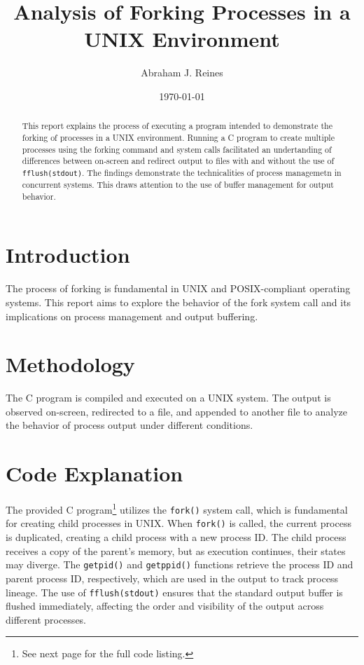 \documentclass[12pt]{article}
\begin{document}
\title{Analysis of Forking Processes in a UNIX Environment}
\author{Abraham J. Reines}
\date{\today}

\maketitle

\begin{abstract}
This report explains the process of executing a program intended to demonstrate the forking of processes in a UNIX environment. Running a C program to create multiple processes using the forking command and system calls facilitated an undertanding of differences between on-screen and redirect output to files with and without the use of \texttt{fflush(stdout)}. The findings demonstrate the technicalities of process managemetn in concurrent systems. This draws attention to the use of buffer management for output behavior. 
\end{abstract}

\section{Introduction}
The process of forking is fundamental in UNIX and POSIX-compliant operating systems. This report aims to explore the behavior of the fork system call and its implications on process management and output buffering.

\section{Methodology}
The C program is compiled and executed on a UNIX system. The output is observed on-screen, redirected to a file, and appended to another file to analyze the behavior of process output under different conditions.

\section{Code Explanation}
The provided C program\footnote{See next page for the full code listing.} utilizes the \texttt{fork()} system call, which is fundamental for creating child processes in UNIX. When \texttt{fork()} is called, the current process is duplicated, creating a child process with a new process ID. The child process receives a copy of the parent's memory, but as execution continues, their states may diverge. The \texttt{getpid()} and \texttt{getppid()} functions retrieve the process ID and parent process ID, respectively, which are used in the output to track process lineage. The use of \texttt{fflush(stdout)} ensures that the standard output buffer is flushed immediately, affecting the order and visibility of the output across different processes.
\end{document}
